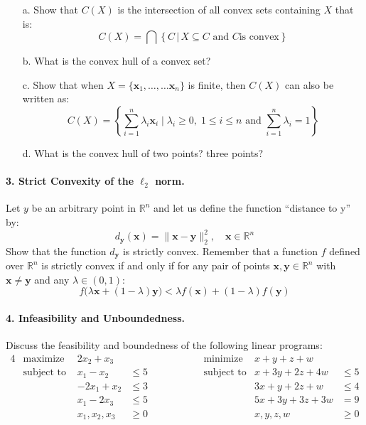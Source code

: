 \documentclass[11pt]{article}
\newcommand{\bx}{\mathbf{x}}
\newcommand{\by}{\mathbf{y}}
\begin{document}
\begin{itemize}
    \item[a.]  Show that $C(X)$ is the intersection of all convex sets
        containing $X$ that is:
        \begin{displaymath}
            C(X) = \bigcap \left \{ C \,|\, X\subseteq C \text{ and } C \text{
            is convex}\right\}
        \end{displaymath}
    \item[b.] What is the convex hull of a convex set?
    \item[c.]
        Show that when $X = \{\bx_1,\ldots,\ldots \bx_n\}$ is finite, then
        $C(X)$ can also be written as: \begin{displaymath} C(X)
            = \left\{\sum_{i=1}^n \lambda_i \bx_i\;|\;\lambda_i\geq 0,\;1\leq
            i\leq n\text{ and } \sum_{i=1}^n \lambda_i=1\right\}
        \end{displaymath}
    \item [d.] What is the convex hull of two points? three points?
\end{itemize}

\paragraph{3. Strict Convexity of the $\ell_2$ norm.}

Let $y$ be an arbitrary point in $\mathbb{R}^n$ and let us define the function
``distance to y'' by:
\begin{displaymath}
    d_{\by}(\bx) = \|\bx-\by\|_2^2,
    \quad \bx\in\mathbb{R}^n
\end{displaymath}
Show that the function $d_{\by}$ is strictly convex. Remember that a function $f$
defined over $\mathbb{R}^n$ is strictly convex if and only if for any pair of
points $\bx, \by\in\mathbb{R}^n$ with $\bx\neq \by$ and any $\lambda\in(0,1)$:
\begin{displaymath}
    f\big(\lambda \bx + (1-\lambda)\by\big) < \lambda f(\bx) + (1-\lambda) f(\by)
\end{displaymath}

\paragraph{4. Infeasibility and Unboundedness.} 

Discuss the feasibility and boundedness of the following linear programs:
\begin{alignat*}{4}
    &\text{maximize }   & 2x_2 + x_3&  &\qquad\qquad&\text{minimize}&x+y+z+w&\\
    &\text{subject to } & x_1 - x_2 &\leq 5&\qquad\qquad&\text{subject to}&x+3y+2z+4w&\leq 5\\
    &                   & -2x_1 + x_2 &\leq 3&\qquad\qquad&&3x+y+2z+w&\leq 4\\
    &                   & x_1 - 2x_3&\leq 5&\qquad\qquad&&5x+3y+3z+3w&=9\\
    &                   &x_1, x_2, x_3&\geq 0&\qquad\qquad&&x, y, z, w&\geq 0\\
\end{alignat*}
\end{document}
